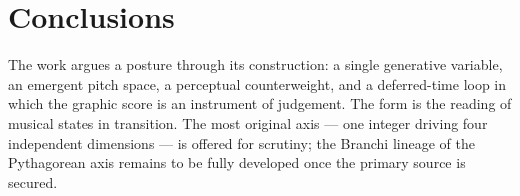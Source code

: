 \documentclass{article}
\begin{document}
\section{Conclusions}\label{sec:conclusions}

The work argues a posture through its construction: a single generative variable,
an emergent pitch space, a perceptual counterweight, and a deferred-time loop in
which the graphic score is an instrument of judgement. The form is the reading of
musical states in transition. The most original axis --- one integer driving four
independent dimensions --- is offered for scrutiny; the Branchi lineage of the
Pythagorean axis remains to be fully developed once the primary source is
secured.


\end{document}
